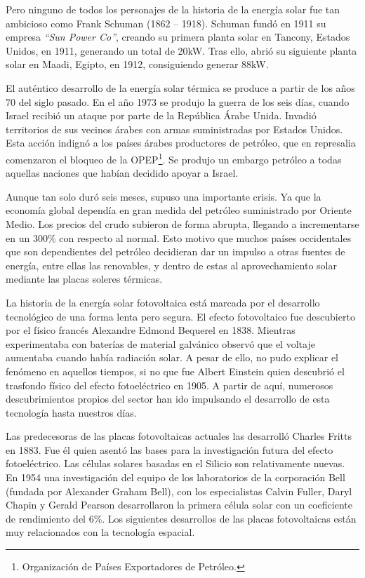 \documentclass[12pt,letterpaper,superscriptaddress]{article}
\begin{document}
Pero ninguno de todos los personajes de la historia de la energía solar fue tan ambicioso como Frank Schuman (1862 – 1918). Schuman fundó en 1911 su empresa \emph{“Sun Power Co”}, creando su primera planta solar en Tancony, Estados Unidos, en 1911, generando un total de 20kW. Tras ello, abrió su siguiente planta solar en Maadi, Egipto, en 1912, consiguiendo generar 88kW.

El auténtico desarrollo de la energía solar térmica se produce a partir de los años 70 del siglo pasado. En el año 1973 se produjo la guerra de los seis días, cuando Israel recibió un ataque por parte de la República Árabe Unida. Invadió territorios de sus vecinos árabes con armas suministradas por Estados Unidos. Esta acción indignó a los países árabes productores de petróleo, que en represalia comenzaron el bloqueo de la OPEP\footnote{Organización de Países Exportadores de Petróleo.}. Se produjo un embargo petróleo a todas aquellas naciones que habían decidido apoyar a Israel.

Aunque tan solo duró seis meses, supuso una importante crisis. Ya que la economía global dependía en gran medida del petróleo suministrado por Oriente Medio. Los precios del crudo subieron de forma abrupta, llegando a incrementarse en un 300\% con respecto al normal. Esto motivo que muchos países occidentales que son dependientes del petróleo decidieran dar un impulso a otras fuentes de energía, entre ellas las renovables, y dentro de estas al aprovechamiento solar mediante las placas soleres térmicas.

La historia de la energía solar fotovoltaica está marcada por el desarrollo tecnológico de una forma lenta pero segura. El efecto fotovoltaico fue descubierto por el físico francés Alexandre Edmond Bequerel en 1838. Mientras experimentaba con baterías de material galvánico observó que el voltaje aumentaba cuando había radiación solar. A pesar de ello, no pudo explicar el fenómeno en aquellos tiempos, si no que fue Albert Einstein quien descubrió el trasfondo físico del efecto fotoeléctrico en 1905. A partir de aquí, numerosos descubrimientos propios del sector han ido impulsando el desarrollo de esta tecnología hasta nuestros días.

Las predecesoras de las placas fotovoltaicas actuales las desarrolló Charles Fritts en 1883. Fue él quien asentó las bases para la investigación futura del efecto fotoeléctrico. Las células solares basadas en el Silicio son relativamente nuevas. En 1954 una investigación del equipo de los laboratorios de la corporación Bell (fundada por Alexander Graham Bell), con los especialistas Calvin Fuller, Daryl Chapin y Gerald Pearson desarrollaron la primera célula solar con un coeficiente de rendimiento del 6\%. Los siguientes desarrollos de las placas fotovoltaicas están muy relacionados con la tecnología espacial.
\end{document}
